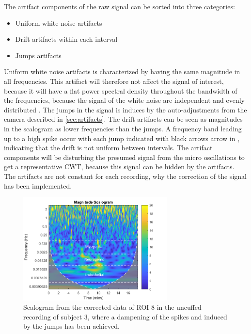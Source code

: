 The artifact components of the raw signal can be sorted into three categories: 
\begin{itemize}
	\item Uniform white noise artifacts
    \item Drift artifacts within each interval
	\item Jumps artifacts
\end{itemize}

Uniform white noise artifacts is characterized by having the same magnitude in all frequencies. This artifact will therefore not affect the signal of interest, because it will have a flat power spectral density throughout the bandwidth of the frequencies, because the signal of the white noise are independent and evenly distributed \cite{hida2014}. 
The jumps in the signal is induces by the auto-adjustments from the camera described in \ref{sec:artifacts}. The drift artifacts can be seen as magnitudes in the scalogram as lower frequencies than the jumps. A frequency band leading up to a high spike occur with each jump indicated with black arrows arrow in , indicating that the drift is not uniform between intervals.
The artifact components will be disturbing the presumed signal from the micro oscillations to get a representative CWT, because this signal can be hidden by the artifacts. The artifacts are not constant for each recording, why the correction of the signal has been implemented.

\begin{figure}[H]
	\includegraphics[width=0.7\textwidth]{figures/cwt_sub3_reg8_corr_uncuffed}
	\caption{Scalogram from the corrected data of ROI 8 in the uncuffed recording of subject 3, where a dampening of the spikes and  induced by the jumps has been achieved.}
	\label{fig:scalogram_corr}
\end{figure} 

